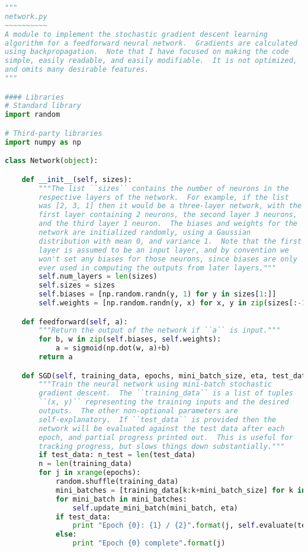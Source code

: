 \begin{lstlisting}[language=Python, caption=Codi original per la xarxa neuronal clàssica]
"""
network.py
~~~~~~~~~~
A module to implement the stochastic gradient descent learning
algorithm for a feedforward neural network.  Gradients are calculated
using backpropagation.  Note that I have focused on making the code
simple, easily readable, and easily modifiable.  It is not optimized,
and omits many desirable features.
"""

#### Libraries
# Standard library
import random

# Third-party libraries
import numpy as np

class Network(object):

	def __init__(self, sizes):
		"""The list ``sizes`` contains the number of neurons in the
		respective layers of the network.  For example, if the list
		was [2, 3, 1] then it would be a three-layer network, with the
		first layer containing 2 neurons, the second layer 3 neurons,
		and the third layer 1 neuron.  The biases and weights for the
		network are initialized randomly, using a Gaussian
		distribution with mean 0, and variance 1.  Note that the first
		layer is assumed to be an input layer, and by convention we
		won't set any biases for those neurons, since biases are only
		ever used in computing the outputs from later layers."""
		self.num_layers = len(sizes)
		self.sizes = sizes
		self.biases = [np.random.randn(y, 1) for y in sizes[1:]]
		self.weights = [np.random.randn(y, x) for x, y in zip(sizes[:-1], sizes[1:])]

	def feedforward(self, a):
		"""Return the output of the network if ``a`` is input."""
		for b, w in zip(self.biases, self.weights):
			a = sigmoid(np.dot(w, a)+b)
		return a

	def SGD(self, training_data, epochs, mini_batch_size, eta, test_data=None):
		"""Train the neural network using mini-batch stochastic
		gradient descent.  The ``training_data`` is a list of tuples
		``(x, y)`` representing the training inputs and the desired
		outputs.  The other non-optional parameters are
		self-explanatory.  If ``test_data`` is provided then the
		network will be evaluated against the test data after each
		epoch, and partial progress printed out.  This is useful for
		tracking progress, but slows things down substantially."""
		if test_data: n_test = len(test_data)
		n = len(training_data)
		for j in xrange(epochs):
			random.shuffle(training_data)
			mini_batches = [training_data[k:k+mini_batch_size] for k in xrange(0, n, mini_batch_size)]
			for mini_batch in mini_batches:
				self.update_mini_batch(mini_batch, eta)
			if test_data:
				print "Epoch {0}: {1} / {2}".format(j, self.evaluate(test_data), n_test)
			else:
				print "Epoch {0} complete".format(j)


\end{lstlisting}
